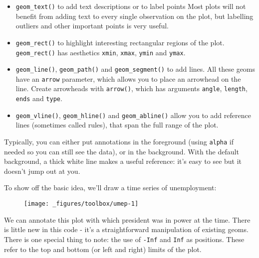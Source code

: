 \begin{itemize}
\item
  \texttt{geom\_text()} to add text descriptions or to label points Most
  plots will not benefit from adding text to every single observation on
  the plot, but labelling outliers and other important points is very
  useful.  
\item
  \texttt{geom\_rect()} to highlight interesting rectangular regions of
  the plot. \texttt{geom\_rect()} has aesthetics \texttt{xmin},
  \texttt{xmax}, \texttt{ymin} and \texttt{ymax}. 
\item
  \texttt{geom\_line()}, \texttt{geom\_path()} and
  \texttt{geom\_segment()} to add lines. All these geoms have an
  \texttt{arrow} parameter, which allows you to place an arrowhead on
  the line. Create arrowheads with \texttt{arrow()}, which has arguments
  \texttt{angle}, \texttt{length}, \texttt{ends} and \texttt{type}.
\item
  \texttt{geom\_vline()}, \texttt{geom\_hline()} and
  \texttt{geom\_abline()} allow you to add reference lines (sometimes
  called rules), that span the full range of the plot.
    
\end{itemize}

Typically, you can either put annotations in the foreground (using
\texttt{alpha} if needed so you can still see the data), or in the
background. With the default background, a thick white line makes a
useful reference: it's easy to see but it doesn't jump out at you.

To show off the basic idea, we'll draw a time series of unemployment:

\begin{Shaded}
\begin{Highlighting}[]
\OperatorTok{+}\StringTok{ }
\StringTok{  }\NormalTok{()}
\end{Highlighting}
\end{Shaded}

\begin{figure}[H]
  \texttt{[image: \_figures/toolbox/umep-1]}
\end{figure}

We can annotate this plot with which president was in power at the time.
There is little new in this code - it's a straightforward manipulation
of existing geoms. There is one special thing to note: the use of
\texttt{-Inf} and \texttt{Inf} as positions. These refer to the top and
bottom (or left and right) limits of the plot. 

